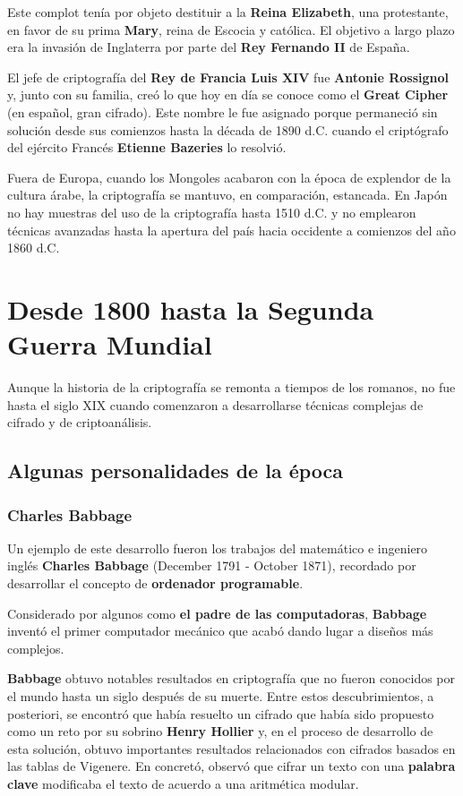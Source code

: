\documentclass[nochap]{apuntesURJC}
\begin{document}
Este complot tenía por objeto destituir a la \textbf{Reina Elizabeth}, una protestante, en favor de su prima \textbf{Mary}, reina de Escocia y católica. El objetivo a largo plazo era la invasión de Inglaterra por parte del \textbf{Rey Fernando II} de España.

El jefe de criptografía del \textbf{Rey de Francia Luis XIV} fue \textbf{Antonie Rossignol} y, junto con su familia, creó lo que hoy en día se conoce como el \textbf{Great Cipher} (en español, gran cifrado). Este nombre le fue asignado porque permaneció sin solución desde sus comienzos hasta la década de 1890 d.C. cuando el criptógrafo del ejército Francés \textbf{Etienne Bazeries} lo resolvió.

Fuera de Europa, cuando los Mongoles acabaron con la época de explendor de la cultura árabe, la criptografía se mantuvo, en comparación, estancada. En Japón no hay muestras del uso de la criptografía hasta 1510 d.C. y no emplearon técnicas avanzadas hasta la apertura del país hacia occidente a comienzos del año 1860 d.C.

\section{Desde 1800 hasta la Segunda Guerra Mundial}
Aunque la historia de la criptografía se remonta a tiempos de los romanos, no fue hasta el siglo XIX cuando comenzaron a desarrollarse técnicas complejas de cifrado y de criptoanálisis.

\subsection{Algunas personalidades de la época}
\subsubsection{Charles Babbage}
Un ejemplo de este desarrollo fueron los trabajos del matemático e ingeniero inglés \textbf{Charles Babbage} (December 1791 - October 1871), recordado por desarrollar el concepto de \textbf{ordenador programable}.

Considerado por algunos como \textbf{el padre de las computadoras}, \textbf{Babbage} inventó el primer computador mecánico que acabó dando lugar a diseños más complejos.

\textbf{Babbage} obtuvo notables resultados en criptografía que no fueron conocidos por el mundo hasta un siglo después de su muerte. Entre estos descubrimientos, a posteriori, se encontró que había resuelto un cifrado que había sido propuesto como un reto por su sobrino \textbf{Henry Hollier} y, en el proceso de desarrollo de esta solución, obtuvo importantes resultados relacionados con cifrados basados en las tablas de Vigenere. En concretó, observó que cifrar un texto con una \textbf{palabra clave} modificaba el texto de acuerdo a una aritmética modular.
\end{document}
